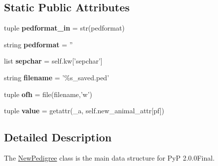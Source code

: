 \subsection*{Static Public Attributes}
\begin{DoxyCompactItemize}
\item 
\hypertarget{classPyPedal_1_1pyp__newclasses_1_1NewPedigree_a77c219cbbdbde1d31ae5fee662698c5b}{
tuple {\bfseries pedformat\_\-in} = str(pedformat)}
\label{classPyPedal_1_1pyp__newclasses_1_1NewPedigree_a77c219cbbdbde1d31ae5fee662698c5b}

\item 
\hypertarget{classPyPedal_1_1pyp__newclasses_1_1NewPedigree_a09f9e630dcc8b1c1f5082deb9ec5c377}{
string {\bfseries pedformat} = ''}
\label{classPyPedal_1_1pyp__newclasses_1_1NewPedigree_a09f9e630dcc8b1c1f5082deb9ec5c377}

\item 
\hypertarget{classPyPedal_1_1pyp__newclasses_1_1NewPedigree_a95d6943300b12758ebc4074eaf2154ce}{
list {\bfseries sepchar} = self.kw\mbox{[}'sepchar'\mbox{]}}
\label{classPyPedal_1_1pyp__newclasses_1_1NewPedigree_a95d6943300b12758ebc4074eaf2154ce}

\item 
\hypertarget{classPyPedal_1_1pyp__newclasses_1_1NewPedigree_a82a4ea979cfd080ad108bb9ad20e1215}{
string {\bfseries filename} = '\%s\_\-saved.ped'}
\label{classPyPedal_1_1pyp__newclasses_1_1NewPedigree_a82a4ea979cfd080ad108bb9ad20e1215}

\item 
\hypertarget{classPyPedal_1_1pyp__newclasses_1_1NewPedigree_a45ee1c369ae5e31ebcbc4ac69de4286e}{
tuple {\bfseries ofh} = file(filename,'w')}
\label{classPyPedal_1_1pyp__newclasses_1_1NewPedigree_a45ee1c369ae5e31ebcbc4ac69de4286e}

\item 
\hypertarget{classPyPedal_1_1pyp__newclasses_1_1NewPedigree_a4fc90a3db622e90771d674597da1cccf}{
tuple {\bfseries value} = getattr(\_\-a, self.new\_\-animal\_\-attr\mbox{[}pf\mbox{]})}
\label{classPyPedal_1_1pyp__newclasses_1_1NewPedigree_a4fc90a3db622e90771d674597da1cccf}

\end{DoxyCompactItemize}


\subsection{Detailed Description}
The \hyperlink{classPyPedal_1_1pyp__newclasses_1_1NewPedigree}{NewPedigree} class is the main data structure for PyP 2.0.0Final. 

